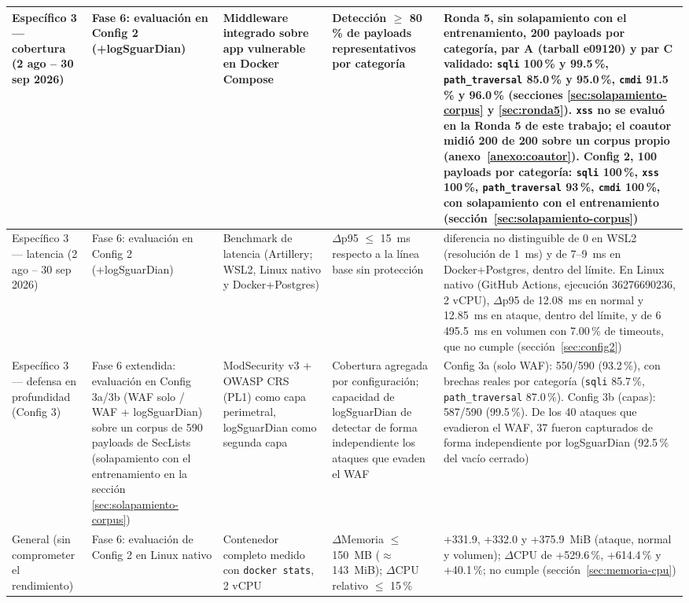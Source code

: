 {\begin{longtable}{|p{2.1cm}|p{2.6cm}|p{2.6cm}|p{2.5cm}|p{4.4cm}|}
Específico 3 --- cobertura (2 ago -- 30 sep 2026) & Fase 6: evaluación en Config 2 (+logSguarDian) & Middleware integrado sobre app vulnerable en Docker Compose & Detección $\geq$ 80\,\% de payloads representativos por categoría & Ronda 5, sin solapamiento con el entrenamiento, 200 payloads por categoría, par A (tarball e09120\textellipsis{}) y par C validado: \texttt{sqli} 100\,\% y 99.5\,\%, \texttt{path\_traversal} 85.0\,\% y 95.0\,\%, \texttt{cmdi} 91.5\,\% y 96.0\,\% (secciones \ref{sec:solapamiento-corpus} y \ref{sec:ronda5}). \texttt{xss} no se evaluó en la Ronda 5 de este trabajo; el coautor midió 200 de 200 sobre un corpus propio (anexo~\ref{anexo:coautor}). Config 2, 100 payloads por categoría: \texttt{sqli} 100\,\%, \texttt{xss} 100\,\%, \texttt{path\_traversal} 93\,\%, \texttt{cmdi} 100\,\%, con solapamiento con el entrenamiento (sección~\ref{sec:solapamiento-corpus}) \\ \hline

Específico 3 --- latencia (2 ago -- 30 sep 2026) & Fase 6: evaluación en Config 2 (+logSguarDian) & Benchmark de latencia (Artillery\parencite{artillery}; WSL2, Linux nativo y Docker+Postgres) & $\Delta$p95 $\leq$ 15~ms respecto a la línea base sin protección & diferencia no distinguible de 0 en WSL2 (resolución de 1~ms) y de 7--9~ms en Docker+Postgres, dentro del límite. En Linux nativo (GitHub Actions, ejecución 36276690236, 2 vCPU), $\Delta$p95 de 12.08~ms en normal y 12.85~ms en ataque, dentro del límite, y de 6\,495.5~ms en volumen con 7.00\,\% de timeouts, que no cumple (sección~\ref{sec:config2}) \\ \hline

Específico 3 --- defensa en profundidad (Config 3) & Fase 6 extendida: evaluación en Config 3a/3b (WAF solo / WAF + logSguarDian) sobre un corpus de 590 payloads de SecLists (solapamiento con el entrenamiento en la sección \ref{sec:solapamiento-corpus}) & ModSecurity v3 + OWASP CRS (PL1) como capa perimetral, logSguarDian como segunda capa & Cobertura agregada por configuración; capacidad de logSguarDian de detectar de forma independiente los ataques que evaden el WAF & Config 3a (solo WAF): 550/590 (93.2\,\%), con brechas reales por categoría (\texttt{sqli} 85.7\,\%, \texttt{path\_traversal} 87.0\,\%). Config 3b (capas): 587/590 (99.5\,\%). De los 40 ataques que evadieron el WAF, 37 fueron capturados de forma independiente por logSguarDian (92.5\,\% del vacío cerrado) \\ \hline

General (sin comprometer el rendimiento) & Fase 6: evaluación de Config 2 en Linux nativo & Contenedor completo medido con \texttt{docker stats}, 2 vCPU & $\Delta$Memoria $\leq$ 150~MB ($\approx$ 143~MiB); $\Delta$CPU relativo $\leq$ 15\,\% & +331.9, +332.0 y +375.9~MiB (ataque, normal y volumen); $\Delta$CPU de +529.6\,\%, +614.4\,\% y +40.1\,\%; no cumple (sección~\ref{sec:memoria-cpu}) \\ \hline


\end{longtable}}
